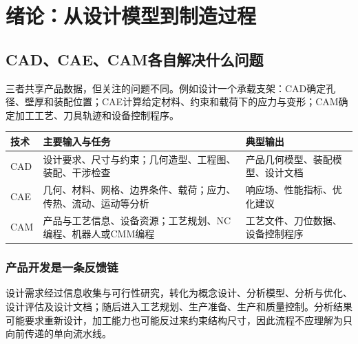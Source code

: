 \chapter{绪论：从设计模型到制造过程}
\label{ch:introduction}

\section{CAD、CAE、CAM各自解决什么问题}

三者共享产品数据，但关注的问题不同。例如设计一个承载支架：CAD确定孔径、壁厚和装配位置；CAE计算给定材料、约束和载荷下的应力与变形；CAM确定加工工艺、刀具轨迹和设备控制程序。

\begin{center}
\renewcommand{\arraystretch}{1.3}
\begin{tabularx}{\linewidth}{lXX}
\toprule
技术 & 主要输入与任务 & 典型输出 \\
\midrule
CAD & 设计要求、尺寸与约束；几何造型、工程图、装配、干涉检查 & 产品几何模型、装配模型、设计文档 \\
CAE & 几何、材料、网格、边界条件、载荷；应力、传热、流动、运动等分析 & 响应场、性能指标、优化建议 \\
CAM & 产品与工艺信息、设备资源；工艺规划、NC编程、机器人或CMM编程 & 工艺文件、刀位数据、设备控制程序 \\
\bottomrule
\end{tabularx}
\end{center}


\subsection{产品开发是一条反馈链}
设计需求经过信息收集与可行性研究，转化为概念设计、分析模型、分析与优化、设计评估及设计文档；随后进入工艺规划、生产准备、生产和质量控制。分析结果可能要求重新设计，加工能力也可能反过来约束结构尺寸，因此流程不应理解为只向前传递的单向流水线。

